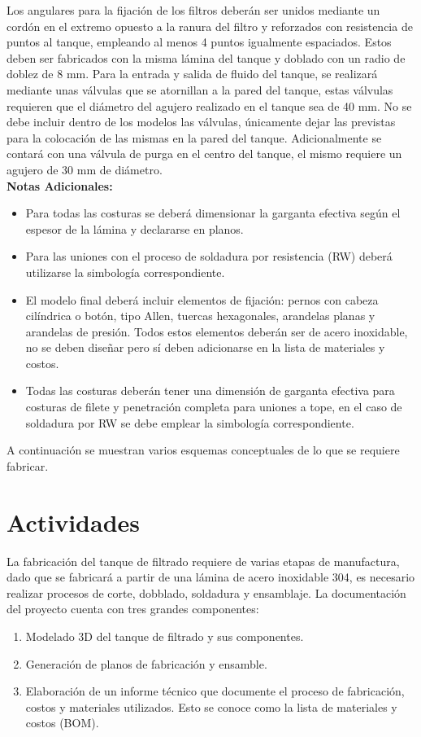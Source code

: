 \documentclass[10pt]{article}
\begin{document}
Los angulares para la fijación de los filtros deberán ser unidos mediante un cordón en el extremo opuesto a la ranura del filtro y reforzados con resistencia de puntos al tanque, empleando al menos 
4 puntos igualmente espaciados. Estos deben ser fabricados con la misma lámina del tanque y doblado con un radio de doblez de 8 mm. Para la entrada y salida de fluido del tanque, se realizará mediante
unas válvulas que se atornillan a la pared del tanque, estas válvulas requieren que el diámetro del agujero realizado en el tanque sea de 40 mm. No se debe incluir dentro de los modelos las válvulas,
únicamente dejar las previstas para la colocación de las  mismas en la pared del tanque. Adicionalmente se contará con una válvula de purga en el centro del tanque, el mismo requiere un agujero de 30 mm 
de diámetro.\\
\textbf{Notas Adicionales:}\\ 
\begin{itemize}
    \item Para todas las costuras se deberá dimensionar la garganta efectiva según el espesor de la lámina y declararse en planos. 
    \item Para las uniones con el proceso de soldadura por resistencia (RW) deberá utilizarse la simbología correspondiente. 
    \item El modelo final deberá incluir elementos de fijación: pernos con cabeza cilíndrica o botón, tipo Allen, tuercas hexagonales, arandelas planas y arandelas de presión. 
    Todos estos elementos deberán ser de acero inoxidable, no se deben diseñar pero sí deben adicionarse en la lista de materiales y costos.
    \item Todas las costuras deberán tener una dimensión de garganta efectiva para costuras de filete y penetración completa para uniones a tope, en el caso de soldadura por RW se debe emplear la simbología correspondiente.
\end{itemize}

A continuación se muestran varios esquemas conceptuales de lo que se requiere fabricar.



\section{Actividades}
La fabricación del tanque de filtrado requiere de varias etapas de manufactura, dado que se fabricará a partir de una lámina de acero inoxidable 304, es necesario realizar procesos de corte, dobblado, 
soldadura y ensamblaje. La documentación del proyecto cuenta con tres grandes componentes:
\begin{enumerate}
    \item Modelado 3D del tanque de filtrado y sus componentes.
    \item Generación de planos de fabricación y ensamble.
    \item Elaboración de un informe técnico que documente el proceso de fabricación, costos y materiales utilizados. Esto se conoce como la lista de materiales y costos (BOM).
\end{enumerate}
\end{document}
